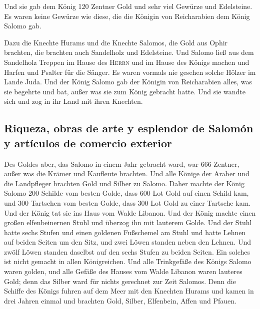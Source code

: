  Und sie gab dem König 120 Zentner Gold und sehr viel
Gewürze und Edelsteine. Es waren keine Gewürze wie diese, die die
Königin von Reicharabien dem König Salomo gab.

 Dazu die Knechte Hurams und die Knechte Salomos, die
Gold aus Ophir brachten, die brachten auch Sandelholz und Edelsteine.
 Und Salomo ließ aus dem Sandelholz Treppen im Hause des
\textsc{Herrn} und im Hause des Königs machen und Harfen und Psalter für
die Sänger. Es waren vormals nie gesehen solche Hölzer im Lande Juda.
 Und der König Salomo gab der Königin von Reicharabien
alles, was sie begehrte und bat, außer was sie zum König gebracht hatte.
Und sie wandte sich und zog in ihr Land mit ihren Knechten.

\hypertarget{riqueza-obras-de-arte-y-esplendor-de-salomuxf3n-y-artuxedculos-de-comercio-exterior}{%
\subsection{Riqueza, obras de arte y esplendor de Salomón y artículos de
comercio
exterior}\label{riqueza-obras-de-arte-y-esplendor-de-salomuxf3n-y-artuxedculos-de-comercio-exterior}}

 Des Goldes aber, das Salomo in einem Jahr gebracht ward,
war 666 Zentner,  außer was die Krämer und Kaufleute
brachten. Und alle Könige der Araber und die Landpfleger brachten Gold
und Silber zu Salomo.  Daher machte der König Salomo 200
Schilde vom besten Golde, dass 600 Lot Gold auf einen Schild kam,
 und 300 Tartschen vom besten Golde, dass 300 Lot Gold zu
einer Tartsche kam.  Und der König tat sie ins Haus vom
Walde Libanon. Und der König machte einen großen elfenbeinernen Stuhl
und überzog ihn mit lauterem Golde.  Und der Stuhl hatte
sechs Stufen und einen goldenen Fußschemel am Stuhl und hatte Lehnen auf
beiden Seiten um den Sitz, und zwei Löwen standen neben den Lehnen.
 Und zwölf Löwen standen daselbst auf den sechs Stufen zu
beiden Seiten. Ein solches ist nicht gemacht in allen Königreichen.
 Und alle Trinkgefäße des Königs Salomo waren golden, und
alle Gefäße des Hauses vom Walde Libanon waren lauteres Gold; denn das
Silber ward für nichts gerechnet zur Zeit Salomos.  Denn
die Schiffe des Königs fuhren auf dem Meer mit den Knechten Hurams und
kamen in drei Jahren einmal und brachten Gold, Silber, Elfenbein, Affen
und Pfauen.

